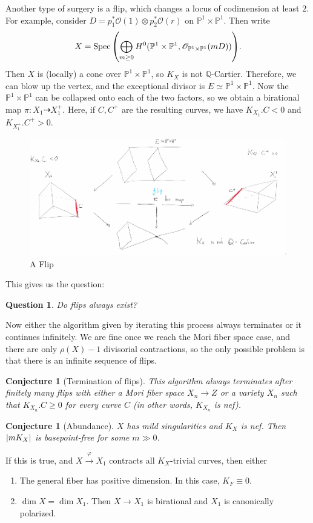\documentclass[leqno, openany]{memoir}
\newtheorem{conj}[thm]{Conjecture}
\newtheorem{quest}[thm]{Question}
\theoremstyle{definition}
\theoremstyle{remark}
\theoremstyle{plain}
\theoremstyle{definition}
\theoremstyle{remark}
\newcommand{\Q}{\mathbb{Q}}
\renewcommand{\P}{\mathbb{P}}
\newcommand{\msc}[1]{\mathscr{#1}}
\DeclareMathOperator{\Spec}{Spec}
\begin{document}
Another type of surgery is a flip, which changes a locus of codimension at least $2$. For example, consider $D = p_1^* \msc{O}(1) \otimes p_2^* \msc{O}(r)$ on $\P^1 \times \P^1$. Then write
\[ X = \Spec \qty(\bigoplus_{m \geq 0} H^0 (\P^1 \times \P^1, \msc{O}_{\P^1 \times \P^1}(mD))). \]
Then $X$ is (locally) a cone over $\P^1 \times \P^1$, so $K_X$ is not $\Q$-Cartier. Therefore, we can blow up the vertex, and the exceptional divisor is $E \simeq \P^1 \times \P^1$. Now the $\P^1 \times \P^1$ can be collapsed onto each of the two factors, so we obtain a birational map $\pi \colon X_1 \dashrightarrow X_1^+$. Here, if $C,C^+$ are the resulting curves, we have $K_{X_1}.C < 0$ and $K_{X_1^+}.C^+ > 0$.
\begin{figure}[H]
    \centering
    \includegraphics[width=0.8\linewidth]{flip}
    \caption{A Flip}%
    \label{fig:flip}
\end{figure}
This gives us the question:
\begin{quest}
    Do flips always exist?
\end{quest}
Now either the algorithm given by iterating this process always terminates or it continues infinitely. We are fine once we reach the Mori fiber space case, and there are only $\rho(X) - 1$ divisorial contractions, so the only possible problem is that there is an infinite sequence of flips.

\begin{conj}[Termination of flips]
    This algorithm always terminates after finitely many flips with either a Mori fiber space $X_n \to Z$ or a variety $X_n$ such that $K_{X_n}.C \geq 0$ for every curve $C$ (in other words, $K_{X_n}$ is nef).
\end{conj}

\begin{conj}[Abundance]
    $X$ has mild singularities and $K_X$ is nef. Then $\abs{m K_X}$ is basepoint-free for some $m \gg 0$.
\end{conj}

If this is true, and $X \xrightarrow{\varphi} X_1$ contracts all $K_X$-trivial curves, then either
\begin{enumerate}
    \item The general fiber has positive dimension. In this case, $K_F \equiv 0$.
    \item $\dim X = \dim X_1$. Then $X \to X_1$ is birational and $X_1$ is canonically polarized.
\end{enumerate}
\end{document}
